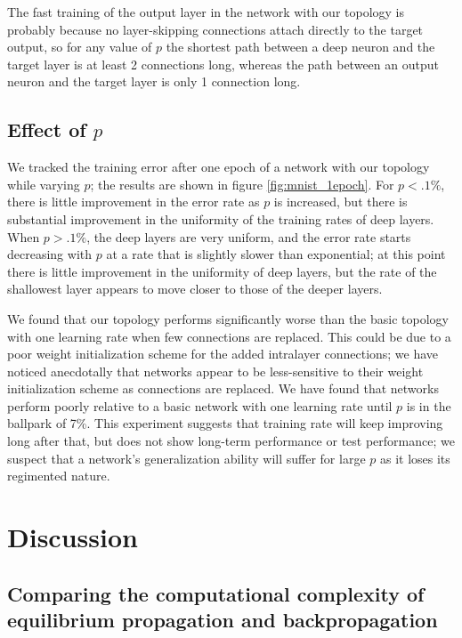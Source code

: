 \documentclass[utf8]{frontiersSCNS}
\begin{document}
The fast training of the output layer in the network with our topology is probably because no layer-skipping connections attach directly to the target output, so for any value of $p$ the shortest path between a deep neuron and the target layer is at least 2 connections long, whereas the path between an output neuron and the target layer is only 1 connection long.

\subsection{Effect of $p$}
\label{sec:mnist_1epoch}

We tracked the training error after one epoch of a network with our topology while varying $p$; the results are shown in figure \ref{fig:mnist_1epoch}. For $p<.1\%$, there is little improvement in the error rate as $p$ is increased, but there is substantial improvement in the uniformity of the training rates of deep layers. When $p>.1\%$, the deep layers are very uniform, and the error rate starts decreasing with $p$ at a rate that is slightly slower than exponential; at this point there is little improvement in the uniformity of deep layers, but the rate of the shallowest layer appears to move closer to those of the deeper layers.

We found that our topology performs significantly worse than the basic topology with one learning rate when few connections are replaced. This could be due to a poor weight initialization scheme for the added intralayer connections; we have noticed anecdotally that networks appear to be less-sensitive to their weight initialization scheme as connections are replaced. We have found that networks perform poorly relative to a basic network with one learning rate until $p$ is in the ballpark of 7\%. This experiment suggests that training rate will keep improving long after that, but does not show long-term performance or test performance; we suspect that a network's generalization ability will suffer for large $p$ as it loses its regimented nature.

\section{Discussion}

\subsection{Comparing the computational complexity of equilibrium propagation and backpropagation}
\end{document}
